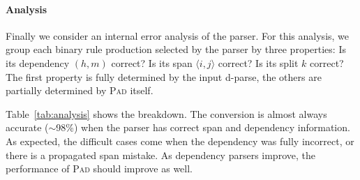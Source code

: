 \documentclass[11pt,letterpaper]{article}
\newcommand{\Span}[1]{\langle #1 \rangle}
\newcommand{\ParseName}{\textsc{Pad}\xspace}
\begin{document}



\paragraph{Analysis}
\label{sec:analysis}
Finally we consider an internal error analysis of
the parser. For this analysis, we group each binary rule production
selected by the parser by three properties:
Is its dependency $(h, m)$ correct? Is its span $\Span{i,j}$ correct? 
Is its split $k$ correct? The first property is fully determined by the 
input d-parse, the others are partially determined by \ParseName itself.

Table~\ref{tab:analysis} shows the breakdown. The
conversion is almost always accurate ($\sim$98\%) when the parser has correct span and
dependency information. As expected, the difficult cases come when the dependency
was fully incorrect, or there is a propagated span mistake. As dependency parsers
improve, the performance of \ParseName{} should improve as well.
 






\end{document}
